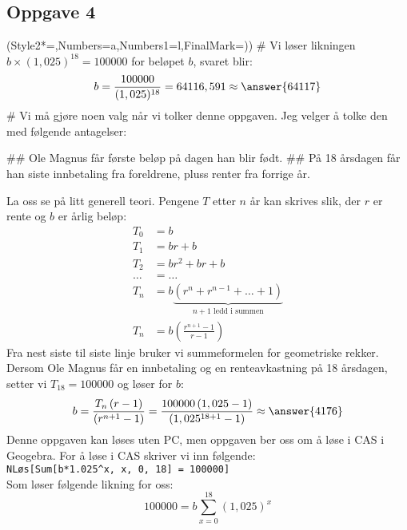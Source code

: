 \subsection*{Oppgave 4}
\begin{easylist}[enumerate]
	\ListProperties(Style2*=,Numbers=a,Numbers1=l,FinalMark={)})
	# Vi løser likningen $b\times (1,025)^{18} = 100000$ for beløpet $b$, svaret blir:
	\begin{equation*}
		b = \frac{100000}{(1,025)^{18}} = 64116,591 \approx \answer{64117}
	\end{equation*}
	# Vi må gjøre noen valg når vi tolker denne oppgaven. Jeg velger å tolke den med følgende antagelser:
	\begin{easylist}
		## Ole Magnus får første beløp på dagen han blir født. 
		## På 18 årsdagen får han siste innbetaling fra foreldrene, pluss renter fra forrige år.
	\end{easylist}
	La oss se på litt generell teori.
	Pengene $T$ etter $n$ år kan skrives slik, der $r$ er rente og $b$ er årlig beløp:
	\begin{align*}
		T_0 &= b \\
		T_1 &= br + b \\
		T_2 &= br^2 + br + b \\
		\ldots &= \ldots \\
		T_n &= b  \underbrace{ \left( r^n + r^{n-1} + \dots + 1 \right)}_{n+1\text{ ledd i summen}}   \\
		T_n &= b  \left( \frac{r^{n+1}-1}{r-1} \right)   
	\end{align*}
	Fra nest siste til siste linje bruker vi summeformelen for geometriske rekker.
	Dersom Ole Magnus får en innbetaling og en renteavkastning på 18 årsdagen, setter vi $T_{18} = 100000$ og løser for $b$:
	\begin{equation*}
		b = \frac{T_{n}\left(r-1\right)}{\left(r^{n+1}-1\right)} = \frac{100000\left(1,025-1\right)}{\left(1,025^{18+1}-1\right)} \approx \answer{4176} 
	\end{equation*}
	Denne oppgaven kan løses uten PC, men oppgaven ber oss om å løse i CAS i Geogebra. For å løse i CAS skriver vi inn følgende: \\
	\texttt{NLøs[Sum[b*1.025\textasciicircum x, x, 0, 18] = 100000]} \\
	Som løser følgende likning for oss:
	\begin{equation*}
		100000 = b \sum_{x=0}^{18} (1,025)^x
	\end{equation*}
	

\end{easylist}
